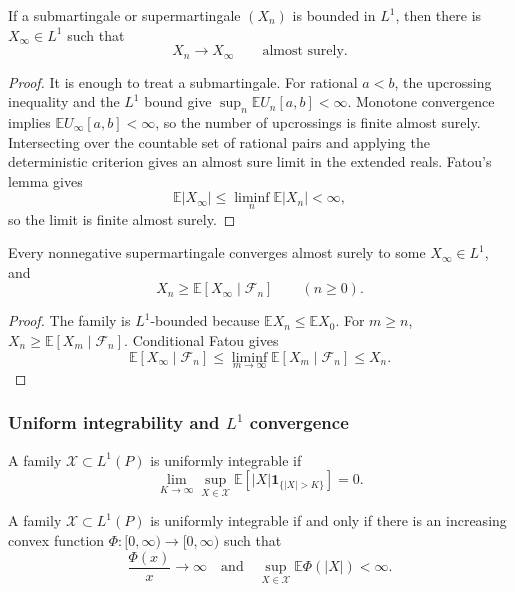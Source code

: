 \begin{thm}
If a submartingale or supermartingale $(X_n)$ is bounded in $L^1$, then there
is $X_\infty\in L^1$ such that
\[
X_n\longrightarrow X_\infty
\qquad\text{almost surely}.
\]
\end{thm}

\begin{proof}
It is enough to treat a submartingale. For rational $a<b$, the upcrossing
inequality and the $L^1$ bound give
$\sup_n\mathbb EU_n[a,b]<\infty$. Monotone convergence implies
$\mathbb EU_\infty[a,b]<\infty$, so the number of upcrossings is finite almost
surely. Intersecting over the countable set of rational pairs and applying the
deterministic criterion gives an almost sure limit in the extended reals.
Fatou's lemma gives
\[
\mathbb E|X_\infty|
 \leq\liminf_n\mathbb E|X_n|<\infty,
\]
so the limit is finite almost surely.
\end{proof}

\begin{cor}
Every nonnegative supermartingale converges almost surely to some
$X_\infty\in L^1$, and
\[
X_n\geq\mathbb E[X_\infty\mid\mathcal F_n]
\qquad(n\geq0).
\]
\end{cor}

\begin{proof}
The family is $L^1$-bounded because
$\mathbb EX_n\leq\mathbb EX_0$. For $m\geq n$,
$X_n\geq\mathbb E[X_m\mid\mathcal F_n]$. Conditional Fatou gives
\[
\mathbb E[X_\infty\mid\mathcal F_n]
 \leq\liminf_{m\to\infty}
      \mathbb E[X_m\mid\mathcal F_n]
 \leq X_n.
\]
\end{proof}

\subsubsection{Uniform integrability and \texorpdfstring{$L^1$}{L1} convergence}

\begin{de}
A family $\mathcal X\subset L^1(P)$ is uniformly integrable if
\[
\lim_{K\to\infty}
 \sup_{X\in\mathcal X}
 \mathbb E[|X|\mathbf1_{\{|X|>K\}}]=0.
\]
\end{de}

\begin{thm}
A family $\mathcal X\subset L^1(P)$ is uniformly integrable if and only if
there is an increasing convex function
$\Phi:[0,\infty)\to[0,\infty)$ such that
\[
\frac{\Phi(x)}x\longrightarrow\infty
\quad\text{and}\quad
\sup_{X\in\mathcal X}\mathbb E\Phi(|X|)<\infty.
\]
\end{thm}

